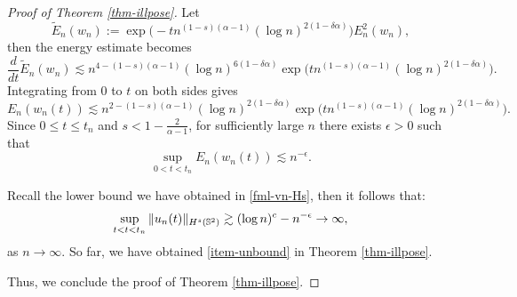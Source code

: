 \documentclass[10pt,a4paper]{amsart}
\numberwithin{equation}{section}
\begin{document}
\begin{proof}[Proof of Theorem \ref{thm-illpose}]
Let 
\begin{equation*}
\widetilde{E}_n(w_n) := \exp{\big(-t n^{(1-s)(\alpha-1)} (\log n)^{2(1-\delta \alpha)}\big) } E^2_n(w_n),
\end{equation*}
then the energy estimate becomes
\begin{equation*}
\frac{d}{dt} \widetilde{E}_n(w_n) \lesssim n^{4-(1-s)(\alpha-1)}(\log n)^{6(1-\delta \alpha)} \exp{\big(t n^{(1-s)(\alpha-1)} (\log n)^{2(1-\delta \alpha)}\big) }.
\end{equation*}
Integrating from $0$ to $t$ on both sides gives
\begin{equation*}
E_n(w_n(t)) \lesssim n^{2-(1-s)(\alpha-1)} (\log n)^{2(1-\delta \alpha)} \exp{\big(t n^{(1-s)(\alpha-1)} (\log n)^{2(1-\delta \alpha)}\big) }.
\end{equation*}
Since $0\le t \le t_n$ and $s<1-\frac{2}{\alpha-1}$, for sufficiently large $n$ there exists $\epsilon>0$ such that
\begin{equation*}
\sup_{0<t<t_n}E_n(w_n(t)) \lesssim n^{-\epsilon}.
\end{equation*}
		
Recall the lower bound we have obtained in \eqref{fml-vn-Hs}, then it follows that:
\begin{equation*}
\sup_{t<t<t_n}\|u_n(t)\|_{H^s(\Bbb S^2)} \gtrsim (\log n)^c - n^{-\epsilon} \to \infty,
\end{equation*}
as $n\to \infty$. So far, we have obtained \eqref{item-unbound} in Theorem \ref{thm-illpose}. 
		
Thus, we conclude the proof of Theorem \ref{thm-illpose}. 
\end{proof}
	
\end{document}
